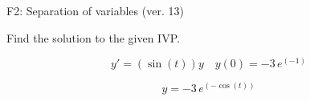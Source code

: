 \begin{exercise}
  \begin{exerciseTitle}F2: Separation of variables (ver. 13)\end{exerciseTitle}
  \begin{exerciseStatement}
    
Find the solution to the given IVP.

    
\[y'=( \sin\left(t\right) )y\hspace{1em} y(0)= -3 \, e^{\left(-1\right)}\]

  \end{exerciseStatement}
  \begin{exerciseAnswer}
    
\[y= -3 \, e^{\left(-\cos\left(t\right)\right)}\]

  \end{exerciseAnswer}
\end{exercise}
